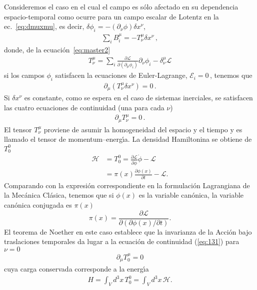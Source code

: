 Consideremos el caso en el cual el campo es sólo afectado en su dependencia espacio-temporal como ocurre para un campo escalar de Lotentz en la ec.~\eqref{eq:dmuxmu}, es decir,
 $\delta\phi_{i}=-\left( \partial_{\nu}\phi \right)\delta x^{\nu}$,
\begin{align}
   \sum_i    B^{\mu}_i= - T^{\mu}_{\nu} \delta x^{\nu}\,,
\end{align}
donde, de la ecuación~\ref{eq:master2}
\begin{align}
  T^{\mu}_{\nu}=\sum_i \frac{\partial\mathcal{L}}{\partial(\partial_{\mu}\phi_i)}\partial_{\nu}\phi_i-\delta^{\mu}_{\nu}\mathcal{L}
\end{align}
si los campos $\phi_{i}$ satisfacen la ecuaciones de Euler-Lagrange, $\mathcal{E}_i=0\,$, tenemos que
\begin{align}
  \partial_{\mu} \left( T^{\mu}_{\nu} \delta x^{\nu}\right)=0\,.
\end{align}
Si $\delta x^{\nu}$ es constante, como se espera en el caso de sistemas inerciales, se satisfacen las cuatro  ecuaciones de continuidad (una para cada $\nu$)
\begin{align}
  \partial_{\mu} T^{\mu}_{\nu}=0\,.
\end{align}
El tensor $T^\mu_\nu$ proviene de asumir la homogeneidad del espacio y el tiempo y es llamado el tensor de momentum--energ\'\i a. 
La densidad Hamiltonina se obtiene de $T^0_0$
\begin{align}
  \label{eq:3}
\mathcal{H}&=T^0_0=\frac{\partial\mathcal{L}}{\partial\dot{\phi}}\dot{\phi}
      -\mathcal{L}\\
      &=\pi(x)\frac{\partial\phi(x)}{\partial t}-\mathcal{L}.
\end{align}
Comparando con la expresi\'on correspondiente en la formulaci\'on
Lagrangiana de la Mec\'anica Cl\'asica, tenemos que si $\phi(x)$ es la
variable can\'onica, la variable can\'onica conjugada es $\pi(x)$
\begin{equation}
  \label{eq:4}
  \pi(x)=\frac{\partial\mathcal{L}}{\partial(\partial\phi(x)/\partial t)}.
\end{equation}
El teorema de Noether en este caso establece que la invarianza de la Acci\'on bajo traslaciones temporales da lugar a la ecuaci\'on de continuidad (\ref{eq:131}) para $\nu=0$
\begin{align}
\label{eq:122}
  \partial_\mu T^\mu_0=0
\end{align}
cuya carga conservada corresponde a la energ\'\i a
\begin{align}
  H=\int_V d^3x\, T^0_0=\int_V d^3x\,\mathcal{H}.
\end{align}
